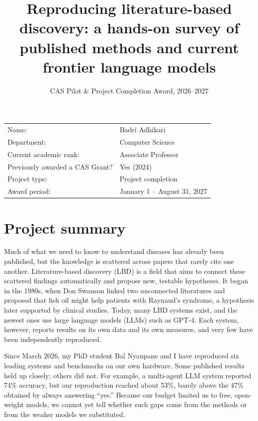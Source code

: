 \documentclass[11pt]{article}
\title{\vspace{-2em}\large\textbf{Reproducing literature-based discovery: a hands-on survey of\\published methods and current frontier language models}}
\author{\normalsize CAS Pilot \& Project Completion Award, 2026--2027}
\date{}
\begin{document}
\maketitle



\begin{tabular}{@{}ll}
Name: & Badri Adhikari \\
Department: & Computer Science \\
Current academic rank: & Associate Professor \\
Previously awarded a CAS Grant? & Yes (2024) \\
Project type: & Project completion \\
Award period: & January 1 -- August 31, 2027 \\
\end{tabular}

\section*{Project summary}

Much of what we need to know to understand diseases has already been published, but the knowledge is scattered across papers that rarely cite one another. Literature-based discovery (LBD) is a field that aims to connect these scattered findings automatically and propose new, testable hypotheses. It began in the 1980s, when Don Swanson linked two unconnected literatures and proposed that fish oil might help patients with Raynaud's syndrome, a hypothesis later supported by clinical studies. Today, many LBD systems exist, and the newest ones use large language models (LLMs) such as GPT-4. Each system, however, reports results on its own data and its own measures, and very few have been independently reproduced.

Since March 2026, my PhD student Bal Nyaupane and I have reproduced six leading systems and benchmarks on our own hardware. Some published results held up closely; others did not. For example, a multi-agent LLM system reported 74\% accuracy, but our reproduction reached about 53\%, barely above the 47\% obtained by always answering ``yes.'' Because our budget limited us to free, open-weight models, we cannot yet tell whether such gaps come from the methods or from the weaker models we substituted.
\end{document}
